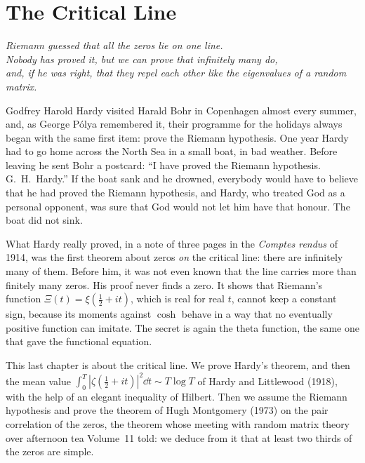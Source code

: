 \chapter{The Critical Line}
\begin{center}\itshape
Riemann guessed that all the zeros lie on one line.\\
Nobody has proved it, but we can prove that infinitely many do,\\
and, if he was right, that they repel each other like the eigenvalues of a random matrix.
\end{center}

Godfrey Harold Hardy visited Harald Bohr in Copenhagen almost every summer, and, as George Pólya remembered it, their programme for the holidays always began with the same first item: prove the Riemann hypothesis. One year Hardy had to go home across the North Sea in a small boat, in bad weather. Before leaving he sent Bohr a postcard: ``I have proved the Riemann hypothesis. G.~H.~Hardy.'' If the boat sank and he drowned, everybody would have to believe that he had proved the Riemann hypothesis, and Hardy, who treated God as a personal opponent, was sure that God would not let him have that honour. The boat did not sink.

What Hardy really proved, in a note of three pages in the \emph{Comptes rendus} of 1914, was the first theorem about zeros \emph{on} the critical line: there are infinitely many of them. Before him, it was not even known that the line carries more than finitely many zeros. His proof never finds a zero. It shows that Riemann's function $\Xi(t)=\xi(\frac12+it)$, which is real for real $t$, cannot keep a constant sign, because its moments against $\cosh$ behave in a way that no eventually positive function can imitate. The secret is again the theta function, the same one that gave the functional equation.

This last chapter is about the critical line. We prove Hardy's theorem, and then the mean value $\int_0^T|\zeta(\frac12+it)|^2\dd t\sim T\log T$ of Hardy and Littlewood (1918), with the help of an elegant inequality of Hilbert. Then we assume the Riemann hypothesis and prove the theorem of Hugh Montgomery (1973) on the pair correlation of the zeros, the theorem whose meeting with random matrix theory over afternoon tea Volume~11 told: we deduce from it that at least two thirds of the zeros are simple.

